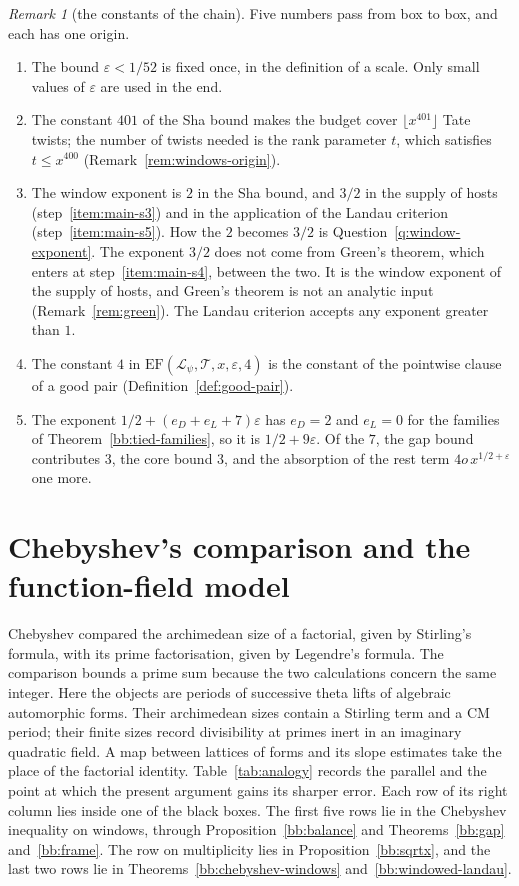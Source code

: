 \documentclass[11pt]{amsbook}
\theoremstyle{plain}
\theoremstyle{definition}
\theoremstyle{remark}
\newtheorem{remark}[theorem]{Remark}
\numberwithin{equation}{section}
\numberwithin{figure}{chapter}
\numberwithin{table}{chapter}
\newcommand{\eps}{\varepsilon}
\newcommand{\lev}{\mathscr{L}}
\newcommand{\Top}{\mathcal{T}}
\begin{document}
\begin{remark}[the constants of the chain]\label{rem:bb-constants}
Five numbers pass from box to box, and each has one origin.
\begin{enumerate}[label=(\arabic*)]
\item The bound $\eps<1/52$ is fixed once, in the definition of a
scale. Only small values of $\eps$ are used in the end.
\item The constant $401$ of the Sha bound makes the budget cover
$\lfloor x^{401}\rfloor$ Tate twists; the number of twists needed is
the rank parameter $t$, which satisfies $t\le x^{400}$
(Remark~\ref{rem:windows-origin}).
\item The window exponent is $2$ in the Sha bound, and $3/2$ in the
supply of hosts (step~\ref{item:main-s3}) and in the application of
the Landau criterion (step~\ref{item:main-s5}). How the $2$ becomes
$3/2$ is Question~\ref{q:window-exponent}. The exponent $3/2$ does
not come from Green's theorem, which enters at
step~\ref{item:main-s4}, between the two. It is the window exponent
of the supply of hosts, and Green's theorem is not an analytic input
(Remark~\ref{rem:green}). The Landau criterion
accepts any exponent greater than $1$.
\item The constant $4$ in $\mathrm{EF}(\lev_\psi,\Top,x,\eps,4)$ is
the constant of the pointwise clause of a good pair
(Definition~\ref{def:good-pair}).
\item The exponent $1/2+(e_D+e_L+7)\eps$ has $e_D=2$ and $e_L=0$ for
the families of Theorem~\ref{bb:tied-families}, so it is
$1/2+9\eps$. Of the $7$, the gap bound contributes $3$, the core
bound $3$, and the absorption of the rest term $4o\,x^{1/2+\eps}$
one more.
\end{enumerate}
\end{remark}

\section{Chebyshev's comparison and the function-field model}
\label{sec:bb-analogy}

Chebyshev compared the archimedean size of a factorial, given by
Stirling's formula, with its prime factorisation, given by
Legendre's formula. The comparison bounds a prime sum because
the two calculations concern the same integer. Here the objects
are periods of successive theta lifts of algebraic automorphic
forms. Their archimedean sizes contain a Stirling term and a CM
period; their finite sizes record divisibility at primes inert
in an imaginary quadratic field. A map between lattices of forms
and its slope estimates take the place of the factorial identity.
Table~\ref{tab:analogy} records the parallel and the point at which
the present argument gains its sharper error. Each row of its right
column lies inside one of the black boxes. The first five rows lie
in the Chebyshev inequality on windows, through
Proposition~\ref{bb:balance} and Theorems~\ref{bb:gap}
and~\ref{bb:frame}. The row on multiplicity lies in
Proposition~\ref{bb:sqrtx}, and the last two rows lie in
Theorems~\ref{bb:chebyshev-windows} and~\ref{bb:windowed-landau}.
\end{document}
